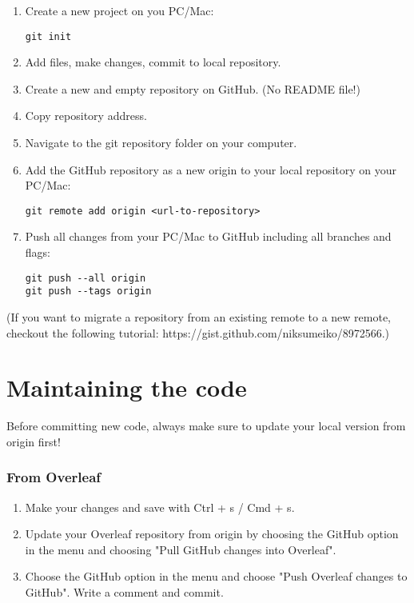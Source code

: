 \documentclass{article}
\begin{document}
\begin{enumerate}
    \item Create a new project on you PC/Mac:
    \begin{verbatim}
git init
    \end{verbatim}
    \item Add files, make changes, commit to local repository.
    \item Create a new and empty repository on GitHub. (No README file!)
    \item Copy repository address.
    \item Navigate to the git repository folder on your computer. 
    \item Add the GitHub repository as a new origin to your local repository on your PC/Mac:
    \begin{verbatim}
git remote add origin <url-to-repository>
    \end{verbatim}
    \item Push all changes from your PC/Mac to GitHub including all branches and flags:
    \begin{verbatim}
git push --all origin
git push --tags origin
    \end{verbatim}
\end{enumerate}

(If you want to migrate a repository from an existing remote to a new remote, checkout the following tutorial: https://gist.github.com/niksumeiko/8972566.)

\section{Maintaining the code}

Before committing new code, always make sure to update your local version from origin first!

\subsubsection{From Overleaf}

\begin{enumerate}
    \item Make your changes and save with Ctrl + s / Cmd + s.
    \item Update your Overleaf repository from origin by choosing the GitHub option in the menu and choosing "Pull GitHub changes into Overleaf".
    \item Choose the GitHub option in the menu and choose "Push Overleaf changes to GitHub". Write a comment and commit.
\end{enumerate}
\end{document}
